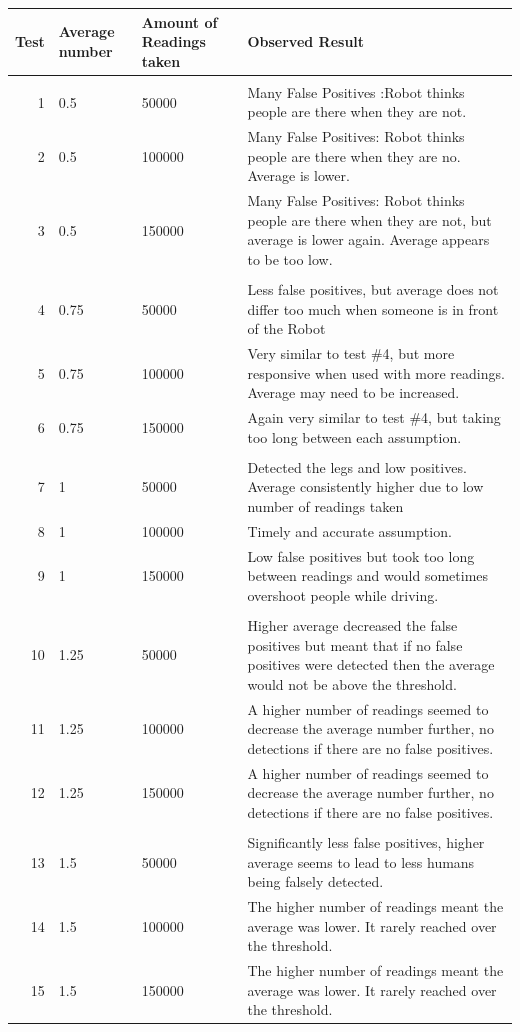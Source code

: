\documentclass{article}
\begin{document}
	\begin{longtable}{r | p{2cm} | p{2.5cm} | p{8cm} }
	Test & Average number & Amount of Readings taken & Observed Result \\
	\hline
	  &  &  \\[2ex]
	1 & 0.5 & 50000 & Many False Positives :Robot thinks people are there when they are not. \\[1ex]
	2 & 0.5 & 100000 & Many False Positives: Robot thinks people are there when they are no. Average is lower. \\ [1ex]
3 & 0.5 & 150000 & Many False Positives: Robot thinks people are there when they are not, but average is lower again. Average appears to be too low. \\ [0ex]

	  &  &  \\[2ex]
4 & 0.75 & 50000 & Less false positives, but average does not differ too much when someone is in front of the Robot \\[1ex] 
5 & 0.75 & 100000 & Very similar to test \#4, but more responsive when used with more readings. Average may need to be increased. \\ [0ex]
6 & 0.75 & 150000 & Again very similar to test \#4, but taking too long between each assumption. \\ [1ex]

	  &  &  \\[2ex]
7 & 1 & 50000 & Detected the legs and low positives. Average consistently higher due to low number of readings taken \\ [1ex]
8 & 1 & 100000 & Timely and  accurate assumption. \\ [2ex]
9 & 1 & 150000 & Low false positives but took too long between readings and would sometimes overshoot people while driving. \\ [1ex]

	  &  &  \\[2ex]
10 & 1.25 & 50000 & Higher average decreased the false positives but meant that if no false positives were detected then the average would not be above the threshold. \\ [0ex]
11 & 1.25 & 100000 & A higher number of readings seemed to decrease the average number further, no detections if there are no false positives. \\ [0ex]
12 & 1.25 & 150000 & A higher number of readings seemed to decrease the average number further, no detections if there are no false positives.  \\[0ex] 

	  &  &  \\[2ex]
13 & 1.5 & 50000 & Significantly less false positives, higher average seems to lead to less humans being falsely detected. \\ [1ex]
14 & 1.5 & 100000 & The higher number of readings meant the average was lower. It rarely reached over the threshold. \\ [1ex]
15 & 1.5 & 150000 & The higher number of readings meant the average was lower. It rarely reached over the threshold. \\[1ex]
	
	\end{longtable}
\end{document}

